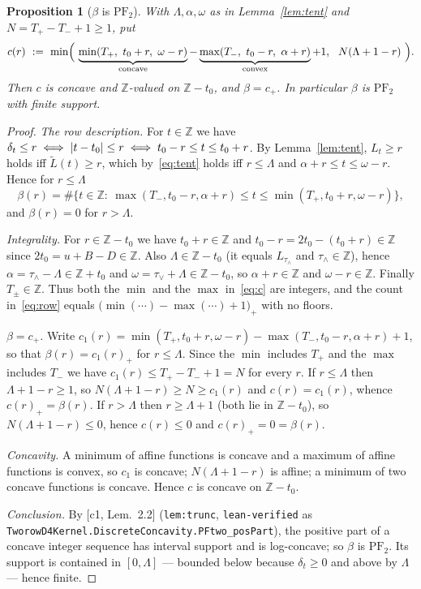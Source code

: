 \documentclass[11pt]{article}
\newtheorem{proposition}[theorem]{Proposition}
\theoremstyle{definition}
\newcommand{\Z}{\mathbb Z}
\newcommand{\PFtwo}{\mathrm{PF}_2}
\DeclarePairedDelimiter{\abs}{\lvert}{\rvert}
\begin{document}
\begin{proposition}[$\beta$ is $\PFtwo$]\label{prop:betaPF2}
With $\Lambda,\alpha,\omega$ as in Lemma~\ref{lem:tent} and $N=T_+-T_-+1\ge1$, put
\begin{equation}\label{eq:c}
  c(r)\ :=\ \min\Bigl(\
   \underbrace{\min(T_+,\ t_0+r,\ \omega-r)}_{\text{concave}}
  -\underbrace{\max(T_-,\ t_0-r,\ \alpha+r)}_{\text{convex}}+1,
  \ \ N(\Lambda+1-r)\ \Bigr).
\end{equation}
Then $c$ is concave and $\Z$-valued on $\Z-t_0$, and $\beta=c_+$. In particular $\beta$ is
$\PFtwo$ with finite support.
\end{proposition}
\begin{proof}
\emph{The row description.} For $t\in\Z$ we have $\delta_t\le r\iff\abs{t-t_0}\le r\iff
t_0-r\le t\le t_0+r$. By Lemma~\ref{lem:tent}, $L_t\ge r$ holds iff
$\widetilde L(t)\ge r$, which by~\eqref{eq:tent} holds iff $r\le\Lambda$ and
$\alpha+r\le t\le\omega-r$. Hence for $r\le\Lambda$
\begin{equation}\label{eq:row}
  \beta(r)=\#\bigl\{t\in\Z:\ \max(T_-,t_0-r,\alpha+r)\le t\le\min(T_+,t_0+r,\omega-r)\bigr\},
\end{equation}
and $\beta(r)=0$ for $r>\Lambda$.

\emph{Integrality.} For $r\in\Z-t_0$ we have $t_0+r\in\Z$ and $t_0-r=2t_0-(t_0+r)\in\Z$
since $2t_0=u+B-D\in\Z$. Also $\Lambda\in\Z-t_0$ (it equals $L_{\tau_\wedge}$ and
$\tau_\wedge\in\Z$), hence $\alpha=\tau_\wedge-\Lambda\in\Z+t_0$ and
$\omega=\tau_\vee+\Lambda\in\Z-t_0$, so $\alpha+r\in\Z$ and $\omega-r\in\Z$. Finally
$T_\pm\in\Z$. Thus both the $\min$ and the $\max$ in~\eqref{eq:c} are integers, and the
count in~\eqref{eq:row} equals $\bigl(\min(\cdots)-\max(\cdots)+1\bigr)_+$ with no floors.

\emph{$\beta=c_+$.} Write $c_1(r)=\min(T_+,t_0+r,\omega-r)-\max(T_-,t_0-r,\alpha+r)+1$, so
that $\beta(r)=c_1(r)_+$ for $r\le\Lambda$. Since the $\min$ includes $T_+$ and the $\max$
includes $T_-$ we have $c_1(r)\le T_+-T_-+1=N$ for every $r$. If $r\le\Lambda$ then
$\Lambda+1-r\ge1$, so $N(\Lambda+1-r)\ge N\ge c_1(r)$ and $c(r)=c_1(r)$, whence
$c(r)_+=\beta(r)$. If $r>\Lambda$ then $r\ge\Lambda+1$ (both lie in $\Z-t_0$), so
$N(\Lambda+1-r)\le0$, hence $c(r)\le0$ and $c(r)_+=0=\beta(r)$.

\emph{Concavity.} A minimum of affine functions is concave and a maximum of affine
functions is convex, so $c_1$ is concave; $N(\Lambda+1-r)$ is affine; a minimum of two
concave functions is concave. Hence $c$ is concave on $\Z-t_0$.

\emph{Conclusion.} By [c1, Lem.~2.2] (\texttt{lem:trunc}, \texttt{lean-verified} as
\verb|TworowD4Kernel.DiscreteConcavity.PFtwo_posPart|), the positive part of a concave
integer sequence has interval support and is log-concave; so $\beta$ is $\PFtwo$. Its
support is contained in $[0,\Lambda]$ --- bounded below because $\delta_t\ge0$ and above by
$\Lambda$ --- hence finite.
\end{proof}
\end{document}
